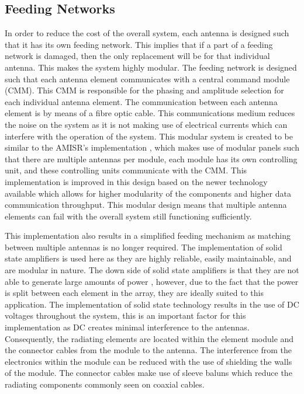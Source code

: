 \documentclass[11pt]{witseiepaper}
\begin{document}
\begin{bibunit}[witseie]


\subsection{Feeding Networks} \label{sec:FeedingNetworks}
In order to reduce the cost of the overall system, each antenna is designed such that it has its own feeding network. This implies that if a part of a feeding network is damaged, then the only replacement will be for that individual antenna. This makes the system highly modular. 
The feeding network is designed such that each antenna element communicates with a central command module (CMM). This CMM is responsible for the phasing and amplitude selection for each individual antenna element.
The communication between each antenna element is by means of a fibre optic cable. This communications medium reduces the noise on the system as it is not making use of electrical currents which can interfere with the operation of the system.
This modular system is created to be similar to the AMISR's implementation \cite{AMISR}, which makes use of modular panels such that there are multiple antennas per module, each module has its own controlling unit, and these controlling units communicate with the CMM.
This implementation is improved in this design based on the newer technology available which allows for higher modularity of the components and higher data communication throughput.
This modular design means that multiple antenna elements can fail with the overall system still functioning sufficiently.

This implementation also results in a simplified feeding mechanism as matching between multiple antennas is no longer required.
The implementation of solid state amplifiers is used here as they are highly reliable, easily maintainable, and are modular in nature. The down side of solid state amplifiers is that they are not able to generate large amounts of power \cite[p.~364]{radarHandbook}, however, due to the fact that the power is split between each element in the array, they are ideally suited to this application. The implementation of solid state technology results in the use of DC voltages throughout the system, this is an important factor for this implementation as DC creates minimal interference to the antennas.
Consequently, the radiating elements are located within the element module and the connector cables from the module to the antenna.
The interference from the electronics within the module can be reduced with the use of shielding the walls of the module. The connector cables make use of sleeve baluns which reduce the radiating components commonly seen on coaxial cables.


\end{bibunit}
\end{document}
